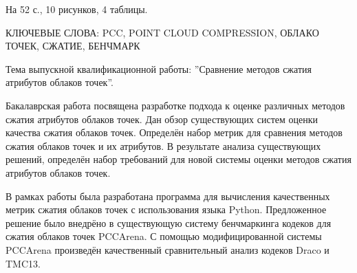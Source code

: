На 52 с., 10 рисунков, 4 таблицы.

КЛЮЧЕВЫЕ СЛОВА: PCC, POINT CLOUD COMPRESSION, ОБЛАКО ТОЧЕК, СЖАТИЕ, БЕНЧМАРК

Тема выпускной квалификационной работы: ''Сравнение методов сжатия атрибутов
облаков точек''.

Бакалаврская работа посвящена разработке подхода к оценке различных методов
сжатия атрибутов облаков точек. Дан обзор существующих систем оценки качества
сжатия облаков точек. Определён набор метрик для сравнения методов сжатия
облаков точек и их атрибутов. В результате анализа существующих решений,
определён набор требований для новой системы оценки методов сжатия атрибутов
облаков точек.

В рамках работы была разработана программа для вычисления качественных метрик
сжатия облаков точек с использования языка Python. Предложенное решение было
внедрёно в существующую систему бенчмаркинга кодеков для сжатия облаков точек
PCCArena. С помощью модифицированной системы PCCArena произведён качественный
сравнительный анализ кодеков Draco и TMC13.
